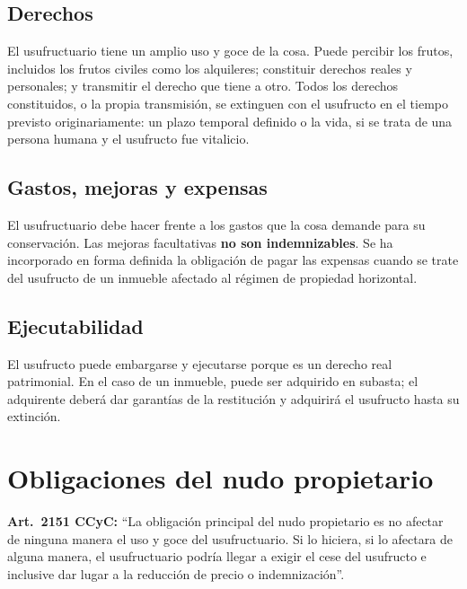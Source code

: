 \documentclass[12pt,oneside]{book}
\begin{document}
\subsection{Derechos}

El usufructuario tiene un amplio uso y goce de la cosa. Puede percibir los frutos, incluidos los frutos civiles como los alquileres; constituir derechos reales y personales; y transmitir el derecho que tiene a otro. Todos los derechos constituidos, o la propia transmisión, se extinguen con el usufructo en el tiempo previsto originariamente: un plazo temporal definido o la vida, si se trata de una persona humana y el usufructo fue vitalicio.

\subsection{Gastos, mejoras y expensas}

El usufructuario debe hacer frente a los gastos que la cosa demande para su conservación.
Las mejoras facultativas \textbf{no son indemnizables}. Se ha incorporado en forma definida la obligación de pagar las expensas cuando se trate del usufructo de un inmueble afectado al régimen de propiedad horizontal.

\subsection{Ejecutabilidad}

El usufructo puede embargarse y ejecutarse porque es un derecho real patrimonial. En el caso de un inmueble, puede ser adquirido en subasta; el adquirente deberá dar garantías de la restitución y adquirirá el usufructo hasta su extinción.

\section{Obligaciones del nudo propietario}

\begin{importante}
\textbf{Art.~2151 CCyC:} ``La obligación principal del nudo propietario es no afectar de ninguna manera el uso y goce del usufructuario. Si lo hiciera, si lo afectara de alguna manera, el usufructuario podría llegar a exigir el cese del usufructo e inclusive dar lugar a la reducción de precio o indemnización''.
\end{importante}
\end{document}
